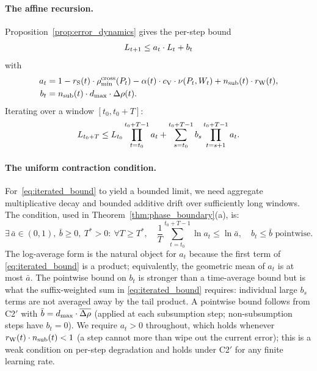 \paragraph{The affine recursion.}
Proposition~\ref{prop:error_dynamics} gives the per-step bound
\begin{equation*}
L_{t+1} \leq a_t \cdot L_t + b_t
\end{equation*}
with
\begin{align*}
a_t &= 1 - r_{\mathrm{S}}(t) \cdot \rho_{\min}^{\mathrm{cross}}(P_t)
   - \alpha(t) \cdot c_{\mathrm{V}} \cdot \nu(P_t, W_t)
   + n_{\mathrm{sub}}(t) \cdot r_{\mathrm{W}}(t), \\
b_t &= n_{\mathrm{sub}}(t) \cdot d_{\mathrm{max}} \cdot \Delta\rho(t).
\end{align*}
Iterating over a window $[t_0, t_0 + T]$:
\begin{equation}
\label{eq:iterated_bound}
L_{t_0 + T} \leq L_{t_0} \prod_{t=t_0}^{t_0+T-1} a_t
  + \sum_{s=t_0}^{t_0+T-1} b_s \prod_{t=s+1}^{t_0+T-1} a_t.
\end{equation}

\paragraph{The uniform contraction condition.}
For~\eqref{eq:iterated_bound} to yield a bounded limit, we need
aggregate multiplicative decay and bounded additive drift over
sufficiently long windows.  The condition, used in
Theorem~\ref{thm:phase_boundary}(a), is:
\begin{equation}
\label{eq:uniform_contraction}
\exists\, \bar{a} \in (0,1),\ \bar{b} \geq 0,\ T^* > 0:\ \forall T \geq T^*,\quad
\frac{1}{T}\!\!\sum_{t=t_0}^{t_0+T-1}\!\! \ln a_t \leq \ln \bar{a},
\quad
b_t \leq \bar{b} \text{ pointwise}.
\end{equation}
The log-average form is the natural object for $a_t$ because the first
term of \eqref{eq:iterated_bound} is a product; equivalently, the
geometric mean of $a_t$ is at most $\bar{a}$.  The pointwise bound on
$b_t$ is stronger than a time-average bound but is what the
suffix-weighted sum in \eqref{eq:iterated_bound} requires: individual
large $b_s$ terms are not averaged away by the tail product.  A pointwise
bound follows from C2$'$ with $\bar{b} = d_{\mathrm{max}} \cdot \overline{\Delta\rho}$
(applied at each subsumption step; non-subsumption steps have
$b_t = 0$).  We require $a_t > 0$ throughout, which holds whenever
$r_{\mathrm{W}}(t) \cdot n_{\mathrm{sub}}(t) < 1$ (a step cannot more than wipe out the
current error); this is a weak condition on per-step degradation and
holds under C2$'$ for any finite learning rate.

